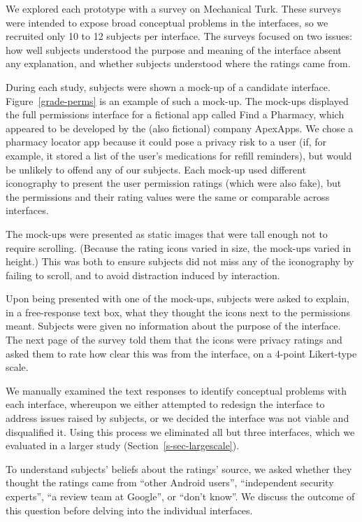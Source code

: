 \documentclass[11pt]{article}
\newcommand{\reffig}[1]{Figure~\ref{#1}}
\newcommand{\refsec}[1]{Section~\ref{#1}}
\begin{document}
We explored each prototype with a survey on Mechanical Turk.
These surveys were 
intended to expose broad conceptual problems 
in the interfaces, so we recruited only 10 to 12 
subjects per interface. The surveys focused on two issues: how well subjects 
understood the purpose and meaning of the interface absent any explanation, 
and whether subjects understood where the ratings came from.

During each study, subjects were shown a mock-up of
a candidate interface. \reffig{grade-perms}
is an example of such a mock-up. The mock-ups displayed the full permissions
interface for a fictional app called Find a Pharmacy, which appeared 
to be developed by the (also fictional) company ApexApps. 
We chose a pharmacy locator app because it 
could pose a privacy risk to a user (if, for example, it stored a list
of the user's medications for refill reminders), but 
would be unlikely to offend any of
our subjects. Each mock-up used different iconography to
present the user permission ratings (which were also fake), but the permissions
and their rating values were the same or comparable across interfaces. 

The mock-ups were presented as static images that were tall enough
not to require scrolling. (Because the rating icons
varied in size, the mock-ups varied in height.) This was both
to ensure subjects did not miss any of the iconography by failing to
scroll, and to avoid distraction induced by interaction.

Upon being presented with one of the mock-ups, subjects were
asked to explain, in a free-response text box, 
what they thought the icons next to the permissions 
meant. Subjects were given no information about the 
purpose of the interface. The next page of the survey 
told them that the icons were privacy 
ratings and asked them to rate how clear this was from 
the interface, on a 4-point Likert-type scale. 

We manually examined 
the text responses to identify conceptual problems with each 
interface, whereupon we either attempted 
to redesign the interface to address issues raised by subjects, 
or we decided the interface was not viable and disqualified it.
Using this process we eliminated all but three interfaces, which we evaluated
in a larger study (\refsec{s-sec-largescale}).

To understand subjects' beliefs about the ratings' source, we asked
whether they thought the ratings came from 
 ``other Android users'', ``independent 
security experts'', ``a review team at Google'', or
``don't know''. We discuss the outcome of this question
before delving into the individual interfaces.
\end{document}
